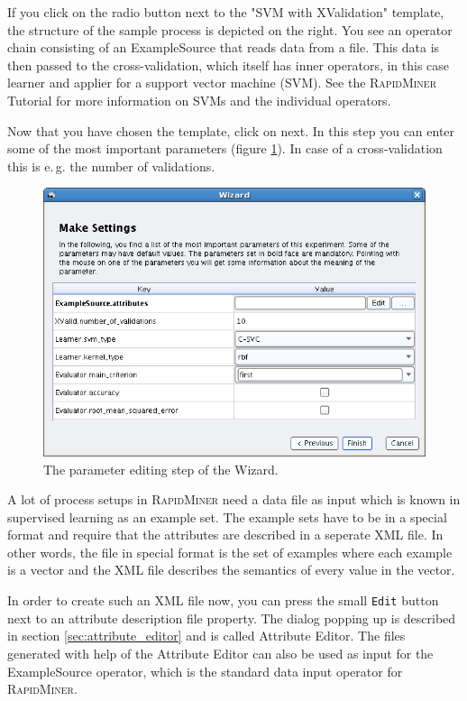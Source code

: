 \documentclass[11pt]{article}
\newcommand{\userinput}[1]{\texttt{#1}}
\newcommand{\useroption}[1]{\textsf{#1}}
\newcommand{\operator}[1]{\textsf{#1}}
\newcommand{\rapidminer}{\protect \textsc{RapidMiner}\xspace}
\begin{document}
If you click on the radio button next to the "SVM with XValidation"
template, the structure of the sample process is depicted on the
right. You see an operator chain consisting of an
\operator{ExampleSource} that reads data from a file. This data is
then passed to the cross-validation, which itself has inner operators,
in this case learner and applier for a support vector machine
(SVM). See the \rapidminer Tutorial for more information on SVMs and the
individual operators.

Now that you have chosen the template, click on \useroption{next}. In
this step you can enter some of the most important parameters (figure
\ref{fig:wizard_parameter_editing}). In case of a cross-validation
this is e.\,g. the number of validations.
\begin{figure}[ht]
\center
\includegraphics[width=0.88\linewidth]{screenshot_template_edit_parameter.png}
\caption{The parameter editing step of the Wizard.}
\label{fig:wizard_parameter_editing}
\end{figure}

A lot of process setups in \rapidminer need a data file as input which is known in supervised 
learning as an example set. The example sets have to be in a special format and require
that the attributes are described in a seperate XML file. In other words, the file in special 
format is the set of examples where each example is a vector and the XML file describes the 
semantics of every value in the vector. 

In order to create such an XML file now, you can press the small
\userinput{Edit} button next to an attribute description file
property. The dialog popping up is described in section
\ref{sec:attribute_editor} and is called Attribute Editor. The files
generated with help of the Attribute Editor can also be used as input
for the ExampleSource operator, which is the standard data input
operator for \rapidminer.
\end{document}
